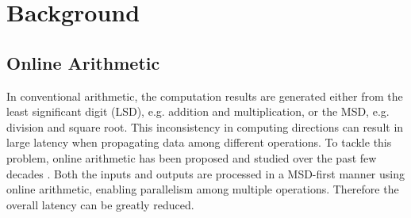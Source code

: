 \documentclass{acm_proc_article-sp}
\begin{document}








\section{Background}
\subsection{Online Arithmetic}
In conventional arithmetic, the computation results are generated either from the least significant digit (LSD), e.g. addition and multiplication, or the MSD, e.g. division and square root. This inconsistency in computing directions can result in large latency when propagating data among different operations. To tackle this problem, online arithmetic has been proposed and studied over the past few decades \cite{Ercegovac_OnlineOverview,Ercegovac_OnlineMult,Online_Trunc}. Both the inputs and outputs are processed in a MSD-first manner using online arithmetic, enabling parallelism among multiple operations. Therefore the overall latency can be greatly reduced.
\vspace{-1ex}
\end{document}
